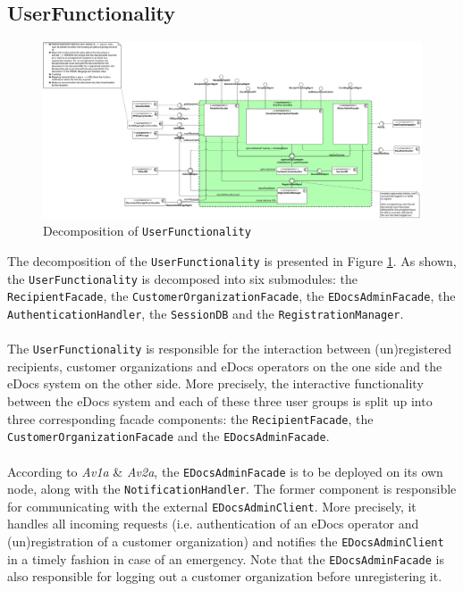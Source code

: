 \documentclass[a4paper,10pt]{article}
\begin{document}
\subsection{UserFunctionality}\label{subsec:decomp-UserFunctionality}
\begin{figure}[!htp]
	\centering
	\includegraphics[height=0.9\textheight]{UserFunctionality.png}
	\caption{Decomposition of \texttt{UserFunctionality}}
	\label{fig:decomp-UserFunctionality}
\end{figure}
\FloatBarrier
\noindent
The decomposition of the \texttt{UserFunctionality} is presented in Figure \ref{fig:decomp-UserFunctionality}. As shown, the \texttt{UserFunctionality} is decomposed into six submodules: the \texttt{RecipientFacade}, the \texttt{CustomerOrganizationFacade}, the \texttt{EDocsAdminFacade}, the \texttt{AuthenticationHandler}, the \texttt{SessionDB} and the \texttt{RegistrationManager}.\\\\
The \texttt{UserFunctionality} is responsible for the interaction between (un)registered recipients, customer organizations and eDocs operators on the one side and the eDocs system on the other side. More precisely, the interactive functionality between the eDocs system and each of these three user groups is split up into three corresponding facade components: the \texttt{RecipientFacade}, the \texttt{CustomerOrganizationFacade} and the \texttt{EDocsAdminFacade}.\\\\
According to \textit{Av1a} \& \textit{Av2a}, the \texttt{EDocsAdminFacade} is to be deployed on its own node, along with the \texttt{NotificationHandler}. The former component is responsible for communicating with the external \texttt{EDocsAdminClient}. More precisely, it handles all incoming requests (i.e. authentication of an eDocs operator and (un)registration of a customer organization) and notifies the \texttt{EDocsAdminClient} in a timely fashion in case of an emergency. Note that the \texttt{EDocsAdminFacade} is also responsible for logging out a customer organization before unregistering it.\\\\
\end{document}
